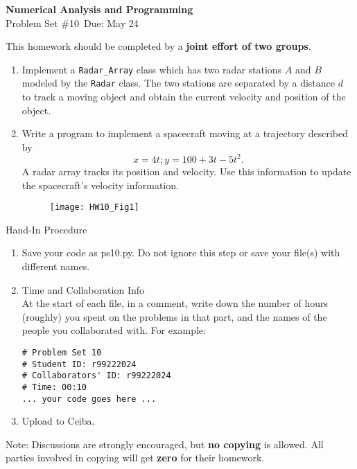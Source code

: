 \documentclass[12pt]{article}
\begin{document}
\begin{center}
\Large
\textbf{Numerical Analysis and Programming}\\
\large
Problem Set \#10\
Due: May 24
\end{center}
This homework should be completed by a \textbf{joint effort of two groups}. 
\begin{enumerate}

\item Implement a \verb!Radar_Array! class which has two radar stations $A$ and $B$ modeled by the \verb!Radar! class. The two stations are  separated by a distance $d$ to track a moving object and obtain the current velocity and position of the object. 

\item Write a program to implement a spacecraft moving at a trajectory described by 
\[
x=4t; y=100+3t-5t^2.
\]
A radar array tracks its position and velocity. Use this information to update the spacecraft's velocity information. 

\begin{figure}[b]
\begin{center}
\texttt{[image: HW10\_Fig1]}
\end{center}
\end{figure}

\end{enumerate}
Hand-In Procedure  
\begin{enumerate}
\item Save your code as  ps10.py.
 Do not ignore this step or save your file(s) with different names. 
\item Time and Collaboration Info \\
At the start of each file, in a comment, write down the number of hours (roughly) you spent on 
the problems in that part, and the names of the people you collaborated with. For example:
\begin{verbatim}
# Problem Set 10
# Student ID: r99222024
# Collaborators' ID: r99222024
# Time: 00:10
... your code goes here ...
\end{verbatim}
\item Upload to Ceiba.
\end{enumerate}
Note: Discussions are strongly encouraged, but \textbf{no copying} is allowed. All parties involved in copying will get \textbf{zero} for their homework. 
\end{document}
